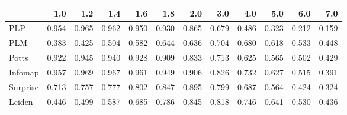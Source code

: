 \begin{tabular}{lrrrrrrrrrrr}
\toprule
{} &   1.0 &   1.2 &   1.4 &   1.6 &   1.8 &   2.0 &   3.0 &   4.0 &   5.0 &   6.0 &   7.0 \\
\midrule
PLP      & 0.954 & 0.965 & 0.962 & 0.950 & 0.930 & 0.865 & 0.679 & 0.486 & 0.323 & 0.212 & 0.159 \\
PLM      & 0.383 & 0.425 & 0.504 & 0.582 & 0.644 & 0.636 & 0.704 & 0.680 & 0.618 & 0.533 & 0.448 \\
Potts    & 0.922 & 0.945 & 0.940 & 0.928 & 0.909 & 0.833 & 0.713 & 0.625 & 0.565 & 0.502 & 0.429 \\
Infomap  & 0.957 & 0.969 & 0.967 & 0.961 & 0.949 & 0.906 & 0.826 & 0.732 & 0.627 & 0.515 & 0.391 \\
Surprise & 0.713 & 0.757 & 0.777 & 0.802 & 0.847 & 0.895 & 0.799 & 0.687 & 0.564 & 0.424 & 0.324 \\
Leiden   & 0.446 & 0.499 & 0.587 & 0.685 & 0.786 & 0.845 & 0.818 & 0.746 & 0.641 & 0.530 & 0.436 \\
\bottomrule
\end{tabular}

